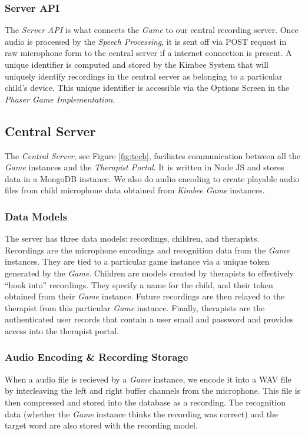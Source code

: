 \documentclass{sig-alternate-2013}
\begin{document}
\subsubsection{Server API}
The {\em Server API} is what connects the {\em Game} to our central recording server. Once audio is processed by the {\em Speech Processing}, it is sent off via POST request in raw microphone form to the central server if a internet connection is present. A unique identifier is computed and stored by the Kimbee System that will uniquely identify recordings in the central server as belonging to a particular child's device. This unique identifier is accessible via the Options Screen in the {\em Phaser Game Implementation}.

\subsection{Central Server}
The {\em Central Server}, see Figure \ref{fig:tech}, faciliates communication between all the {\em Game} instances and the {\em Therapist Portal}. It is written in Node JS and stores data in a MongoDB instance. We also do audio encoding to create playable audio files from child microphone data obtained from {\em Kimbee Game} instances.

\subsubsection{Data Models}
  The server has three data models: recordings, children, and therapists. Recordings are the microphone encodings and recognition data from the {\em Game} instances. They are tied to a particular game instance via a unique token generated by the {\em Game}. Children are models created by therapists to effectively ``hook into'' recordings. They specify a name for the child, and their token obtained from their {\em Game} instance. Future recordings are then relayed to the therapist from this particular {\em Game} instance. Finally, therapists are the authenticated user records that contain a user email and password and provides access into the therapist portal.

\subsubsection{Audio Encoding \& Recording Storage}
  When a audio file is recieved by a {\em Game} instance, we encode it into a WAV file by interleaving the left and right buffer channels from the microphone. This file is then compressed and stored into the database as a recording. The recognition data (whether the {\em Game} instance thinks the recording was correct) and the target word are also stored with the recording model.
\end{document}
